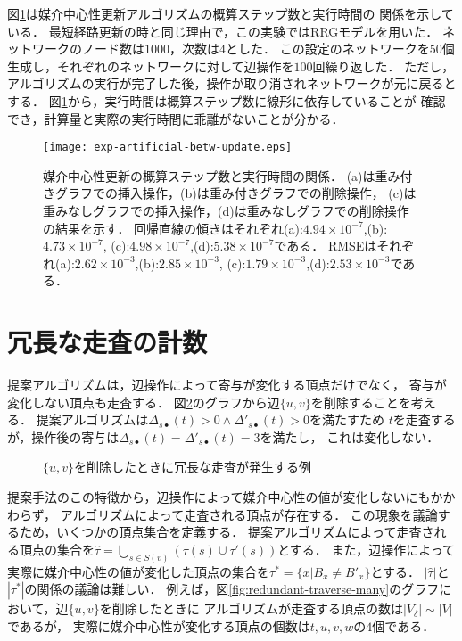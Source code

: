 図\ref{fig:exp-artificial-betw-update}は媒介中心性更新アルゴリズムの概算ステップ数と実行時間の
関係を示している．
最短経路更新の時と同じ理由で，この実験ではRRGモデルを用いた．
ネットワークのノード数は$1000$，次数は$4$とした．
この設定のネットワークを$50$個生成し，それぞれのネットワークに対して辺操作を$100$回繰り返した．
ただし，アルゴリズムの実行が完了した後，操作が取り消されネットワークが元に戻るとする．
図\ref{fig:exp-artificial-betw-update}から，実行時間は概算ステップ数に線形に依存していることが
確認でき，計算量と実際の実行時間に乖離がないことが分かる．

\begin{figure}
  \centering
  \texttt{[image: exp-artificial-betw-update.eps]}
  \caption{
    媒介中心性更新の概算ステップ数と実行時間の関係．
    (a)は重み付きグラフでの挿入操作，(b)は重み付きグラフでの削除操作，
    (c)は重みなしグラフでの挿入操作，(d)は重みなしグラフでの削除操作の結果を示す．
    回帰直線の傾きはそれぞれ(a):$4.94\times10^{-7}$,(b):$4.73\times10^{-7}$,
    (c):$4.98\times10^{-7}$,(d):$5.38\times10^{-7}$である．
    RMSEはそれぞれ(a):$2.62\times10^{-3}$,(b):$2.85\times10^{-3}$,
    (c):$1.79\times10^{-3}$,(d):$2.53\times10^{-3}$である．
  }
  \label{fig:exp-artificial-betw-update}
\end{figure}

\section{冗長な走査の計数}

提案アルゴリズムは，辺操作によって寄与が変化する頂点だけでなく，
寄与が変化しない頂点も走査する．
図\ref{fig:redundant-traverse}のグラフから辺$\{u,v\}$を削除することを考える．
提案アルゴリズムは$\Delta_{s\bullet}(t)>0\land\Delta'_{s\bullet}(t)>0$を満たすため
$t$を走査するが，操作後の寄与は$\Delta_{s\bullet}(t)=\Delta'_{s\bullet}(t)=3$を満たし，
これは変化しない．

\begin{figure}[tb]
  \centering
  \def\svgwidth{.45\linewidth}
  
  \caption{$\{u,v\}$を削除したときに冗長な走査が発生する例}
  \label{fig:redundant-traverse}
\end{figure}

提案手法のこの特徴から，辺操作によって媒介中心性の値が変化しないにもかかわらず，
アルゴリズムによって走査される頂点が存在する．
この現象を議論するため，いくつかの頂点集合を定義する．
提案アルゴリズムによって走査される頂点の集合を$\hat{\tau}=\bigcup_{s\in S(v)}(\tau(s)\cup\tau'(s))$とする．
また，辺操作によって実際に媒介中心性の値が変化した頂点の集合を$\tau^\ast=\{x|B_x\neq B'_{x}\}$とする．
$|\hat{\tau}|$と$|\tau^\ast|$の関係の議論は難しい．
例えば，図\ref{fig:redundant-traverse-many}のグラフにおいて，辺$\{u,v\}$を削除したときに
アルゴリズムが走査する頂点の数は$\lvert V_\delta\rvert\sim \lvert V\rvert$であるが，
実際に媒介中心性が変化する頂点の個数は$t,u,v,w$の$4$個である．

